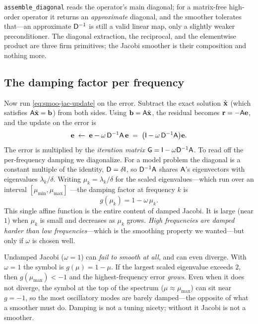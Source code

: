 \begin{notationbox}
\lstinline[style=l4style]|assemble_diagonal| reads the operator's main diagonal;
for a matrix-free high-order operator it returns an \emph{approximate} diagonal,
and the smoother tolerates that---an approximate $\mathsf{D}^{-1}$ is still a valid
linear map, only a slightly weaker preconditioner. The diagonal extraction, the
reciprocal, and the elementwise product are three firm primitives; the Jacobi
smoother is their composition and nothing more.
\end{notationbox}

\subsection{The damping factor per frequency}

Now run \cref{eq:smoo-jac-update} on the error. Subtract the exact solution
$\hat{\mathbf{x}}$ (which satisfies $\mathsf{A}\hat{\mathbf{x}}=\mathbf{b}$) from both sides. Using
$\mathbf{b} = \mathsf{A}\hat{\mathbf{x}}$, the residual becomes $\mathbf{r} = -\mathsf{A}\mathbf{e}$, and the update on
the error is
\begin{equation}
  \mathbf{e} \;\leftarrow\; \mathbf{e} - \omega\,\mathsf{D}^{-1}\mathsf{A}\,\mathbf{e}
       \;=\; \bigl(\mathsf{I} - \omega\,\mathsf{D}^{-1}\mathsf{A}\bigr)\mathbf{e}.
  \label{eq:smoo-jac-iter}
\end{equation}
The error is multiplied by the \emph{iteration matrix}
$\mathsf{G} = \mathsf{I} - \omega\mathsf{D}^{-1}\mathsf{A}$. To read off the per-frequency
damping we diagonalize. For a model problem the diagonal is a constant multiple of
the identity, $\mathsf{D} = \delta\mathsf{I}$, so $\mathsf{D}^{-1}\mathsf{A}$ shares $\mathsf{A}$'s
eigenvectors with eigenvalues $\lambda_k/\delta$. Writing $\mu_k = \lambda_k/\delta$
for the scaled eigenvalues---which run over an interval $[\mu_{\min},\mu_{\max}]$
---the damping factor at frequency $k$ is
\begin{equation}
  \boxed{\;
  g(\mu_k) = 1 - \omega\,\mu_k.
  \;}
  \label{eq:smoo-jac-symbol}
\end{equation}
This single affine function is the entire content of damped Jacobi. It is large
(near $1$) when $\mu_k$ is small and decreases as $\mu_k$ grows. \emph{High
frequencies are damped harder than low frequencies}---which is the smoothing
property we wanted---but only if $\omega$ is chosen well.

\begin{pitfall}
Undamped Jacobi ($\omega = 1$) can \emph{fail to smooth at all}, and can even
diverge. With $\omega=1$ the symbol is $g(\mu)=1-\mu$. If the largest scaled
eigenvalue exceeds $2$, then $g(\mu_{\max}) < -1$ and the highest-frequency error
\emph{grows}. Even when it does not diverge, the symbol at the top of the spectrum
($\mu \approx \mu_{\max}$) can sit near $g=-1$, so the most oscillatory modes are
barely damped---the opposite of what a smoother must do. Damping is not a tuning
nicety; without it Jacobi is not a smoother.
\end{pitfall}

